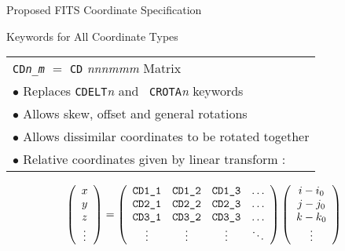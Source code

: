 \centerline{\Huge Proposed FITS Coordinate Specification}
\vskip 20pt
\centerline{\Huge Keywords for All Coordinate Types}
\vskip 20pt
\begin{center}
\begin{tabular}{l}
\multicolumn{1}{l}{ {\tt CD{\it n}\_{\it m}} $ = $ {\tt CD}{\it
      nnn}{\it mmm} {\Huge Matrix}} \\
\hphantom{aa} $\bullet$  Replaces {\tt CDELT}{\it n} and {\tt
                            CROTA}{\it n} keywords \\
\hphantom{aa} $\bullet$  Allows skew, offset and general rotations \\
\hphantom{aa} $\bullet$  Allows dissimilar coordinates to be rotated
                            together \\
\hphantom{aa} $\bullet$  Relative coordinates given by linear
                            transform :
\end{tabular}
\end{center}
\begin{displaymath}
\left ( \begin{array}{c} x \\ y \\ z \\ \vdots \end{array} \right ) =
   \left ( \begin{array}{cccc}
   \hbox{{\tt CD1\_1}} & \hbox{{\tt CD1\_2}} & \hbox{{\tt CD1\_3}} &
         \ldots \\ 
   \hbox{{\tt CD2\_1}} & \hbox{{\tt CD2\_2}} & \hbox{{\tt CD2\_3}} &
         \ldots \\ 
   \hbox{{\tt CD3\_1}} & \hbox{{\tt CD3\_2}} & \hbox{{\tt CD3\_3}} &
         \ldots \\ 
   \vdots          & \vdots          & \vdots          & \ddots
   \end{array} \right )
   \left ( \begin{array}{c}
   i - i_0 \\ j - j_0 \\ k - k_0 \\ \vdots \end{array} \right )
\end{displaymath}
\vfill\eject

\hphantom{aaa}
\vskip -25pt

